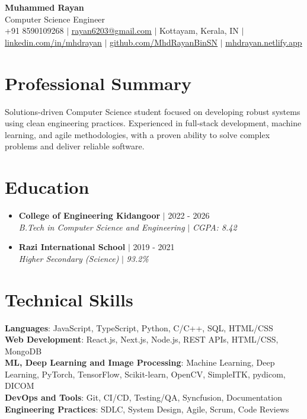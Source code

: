 \documentclass[letterpaper,10pt]{article}
\newcommand{\resumeEducationHeading}[4]{
  \vspace{-2pt}\item
    \textbf{#1} $|$ \small #2 \\
    \textit{\small #3} $|$ \textit{\small #4}
    \vspace{-6pt}
}
\newcommand{\resumeSubHeadingListStart}{\begin{itemize}[leftmargin=0.15in, label={}, itemsep=0pt, topsep=2pt]}
\newcommand{\resumeSubHeadingListEnd}{\end{itemize}}
\begin{document}
\begin{center}
    \textbf{\Huge \rmfamily Muhammed Rayan} \\ \vspace{1pt}
    \small Computer Science Engineer \\ \vspace{1pt}
    \small +91 8590109268 $|$ \href{mailto:rayan6203@gmail.com}{\underline{rayan6203@gmail.com}} $|$
    Kottayam, Kerala, IN $|$
    \href{https://linkedin.com/in/mhdrayan}{\underline{linkedin.com/in/mhdrayan}} $|$
    \href{https://github.com/MhdRayanBinSN}{\underline{github.com/MhdRayanBinSN}} $|$
    \href{https://mhdrayan.netlify.app/}{\underline{mhdrayan.netlify.app}}
\end{center}

\section{Professional Summary}
\small{Solutions-driven Computer Science student focused on developing robust systems using clean engineering practices. Experienced in full-stack development, machine learning, and agile methodologies, with a proven ability to solve complex problems and deliver reliable software.}

\section{Education}
  \resumeSubHeadingListStart
    \resumeEducationHeading
      {College of Engineering Kidangoor}{2022 - 2026}
      {B.Tech in Computer Science and Engineering}{CGPA: 8.42}
    \resumeEducationHeading
      {Razi International School}{2019 - 2021}
      {Higher Secondary (Science)}{93.2\%}
  \resumeSubHeadingListEnd

\section{Technical Skills}
 \begin{itemize}[leftmargin=0.15in, label={}]
    \small{\item{
     \textbf{Languages}{: JavaScript, TypeScript, Python, C/C++, SQL, HTML/CSS} \\
     \textbf{Web Development}{: React.js, Next.js, Node.js, REST APIs, HTML/CSS, MongoDB} \\
     \textbf{ML, Deep Learning and Image Processing}{: Machine Learning, Deep Learning, PyTorch, TensorFlow, Scikit-learn, OpenCV, SimpleITK, pydicom, DICOM} \\
     \textbf{DevOps and Tools}{: Git, CI/CD, Testing/QA, Syncfusion, Documentation} \\
     \textbf{Engineering Practices}{: SDLC, System Design, Agile, Scrum, Code Reviews}
    }}
 \end{itemize}
\end{document}
